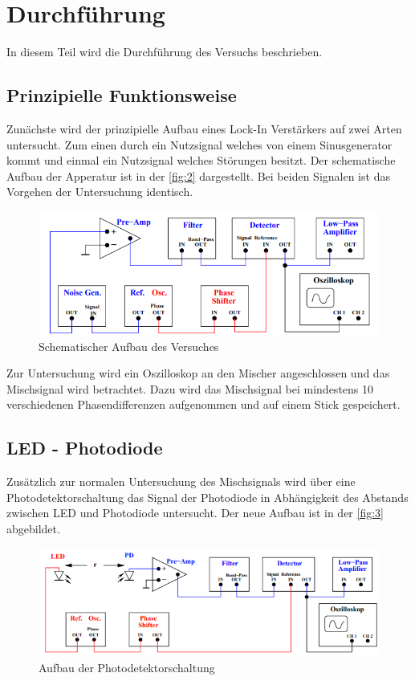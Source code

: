 \newpage
\section{Durchführung}
In diesem Teil wird die Durchführung des Versuchs beschrieben.

\subsection{Prinzipielle Funktionsweise}
Zunächste wird der prinzipielle Aufbau eines Lock-In Verstärkers auf zwei Arten untersucht. Zum einen durch ein Nutzsignal welches von einem Sinusgenerator kommt und einmal ein Nutzsignal welches Störungen besitzt. Der schematische Aufbau der Apperatur ist in der \autoref{fig:2} dargestellt. Bei beiden Signalen ist das Vorgehen der Untersuchung identisch.

\begin{figure}[H]
    \centering
    \includegraphics{Picture/2.png}
    \caption{Schematischer Aufbau des Versuches \cite{V303}}
    \label{fig:2}
\end{figure}

\noindent
Zur Untersuchung wird ein Oszilloskop an den Mischer angeschlossen und das Mischsignal wird betrachtet. Dazu wird das Mischsignal bei mindestens 10 verschiedenen Phasendifferenzen aufgenommen und auf einem Stick gespeichert.

\newpage
\subsection{LED - Photodiode}
Zusätzlich zur normalen Untersuchung des Mischsignals wird über eine Photodetektorschaltung das Signal der Photodiode in Abhängigkeit des Abstands zwischen LED und Photodiode untersucht. Der neue Aufbau ist in der \autoref{fig:3} abgebildet.

\begin{figure}[H]
    \centering
    \includegraphics{Picture/3.png}
    \caption{Aufbau der Photodetektorschaltung \cite{V303}}
    \label{fig:3}
\end{figure}
\noindent
